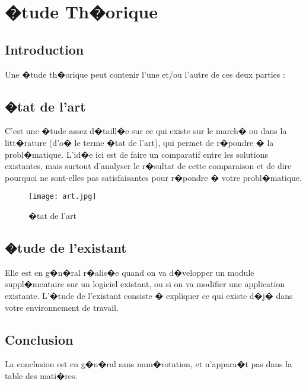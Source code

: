\setcounter{mtc}{5} %
\chapter{�tude Th�orique}
\minitoc  %

\graphicspath{{Chapitre1/figures/}}
\pagestyle{fancy}
\fancyhf{}
\fancyhead[R]{\bfseries\rightmark}
\fancyfoot[R]{\thepage}
\renewcommand{\headrulewidth}{0.5pt}
\renewcommand{\footrulewidth}{0pt}
\renewcommand{\chaptermark}[1]{\markboth{\MakeUppercase{\chaptername~\thechapter. #1 }}{}}
\renewcommand{\sectionmark}[1]{\markright{\thechapter.\thesection~ #1}}

\begin{spacing}{1.2}

\section*{Introduction}
Une �tude th�orique \cite{YOUSFI2015} peut contenir l'une et/ou l'autre de ces deux parties :
\section{�tat de l'art} 
C'est une �tude assez d�taill�e sur ce qui existe sur le march� ou dans la litt�rature (d'o� 
le terme �tat de l'art), qui permet de r�pondre � la probl�matique. L'id�e ici est de faire 
un comparatif entre les solutions existantes, mais surtout d'analyser le r�sultat de cette 
comparaison et de dire pourquoi ne sont-elles pas satisfaisantes pour r�pondre � votre 
probl�matique.
\begin{figure}[!ht]\centering
\texttt{[image: art.jpg]}
\caption{�tat de l'art}
\label{fig:fig1}
\end{figure}
\section{�tude de l'existant}
Elle est en g�n�ral r�alis�e quand on va d�velopper un module suppl�mentaire sur un 
logiciel existant, ou si on va modifier une application existante. L'�tude de l'existant
consiste � expliquer ce qui existe d�j� dans votre environnement de travail.

\section*{Conclusion}
La conclusion est en g�n�ral sans num�rotation, et n'appara�t pas dans la table des mati�res.


\end{spacing}
